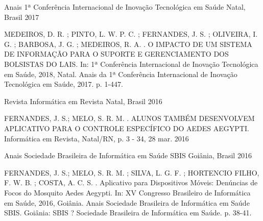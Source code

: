 

\begin{cventries}

  \cventry
    {Anais} %
    {1ª Conferência Internacional de Inovação Tecnológica em Saúde} %
    {Natal, Brasil} %
    {2017} %
    {
      \begin{cvitems} %
        \item {MEDEIROS, D. R. ; PINTO, L. W. P. C. ; FERNANDES, J. S. ; OLIVEIRA, I. G. ; BARBOSA, J. G. ; MEDEIROS, R. A. . O IMPACTO DE UM SISTEMA DE INFORMAÇÃO PARA O SUPORTE E GERENCIAMENTO DOS BOLSISTAS DO LAIS. In: 1ª Conferência Internacional de Inovação Tecnológica em Saúde, 2018, Natal. Anais da 1ª Conferência Internacional de Inovação Tecnológica em Saúde, 2017. p. 1-447.}
      \end{cvitems}
    }
  \cventry
    {Revista} %
    {Informática em Revista} %
    {Natal, Brasil} %
    {2016} %
    {
      \begin{cvitems} %
        \item {FERNANDES, J. S.; MELO, S. R. M. . ALUNOS TAMBÉM DESENVOLVEM APLICATIVO PARA O CONTROLE ESPECÍFICO DO AEDES AEGYPTI. Informática em Revista, Natal/RN, p. 3 - 34, 28 mar. 2016}
      \end{cvitems}
    }

  \cventry
    {Anais} %
    {Sociedade Brasileira de Informática em Saúde SBIS} %
    {Goiânia, Brasil} %
    {2016} %
    {
      \begin{cvitems} %
        \item {FERNANDES, J. S.; MELO, S. R. M. ; SILVA, L. G. F. ; HORTENCIO FILHO, F. W. B. ; COSTA, A. C. S. . Aplicativo para Dispositivos Móveis: Denúncias de Focos do Mosquito Aedes Aegypti. In: XV Congresso Brasileiro de Informática em Saúde, 2016, Goiânia. Anais Sociedade Brasileira de Informática em Saúde SBIS. Goiânia: SBIS ? Sociedade Brasileira de Informática em Saúde. p. 38-41.}
      \end{cvitems}
    }


\end{cventries}
